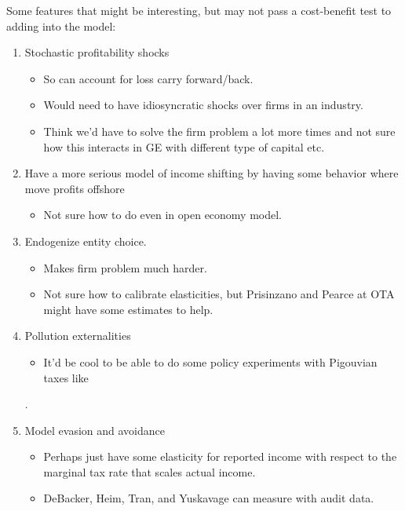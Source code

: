 Some features that might be interesting, but may not pass a cost-benefit test to adding into the model:	
\begin{enumerate}
\item Stochastic profitability shocks	
	\begin{itemize}
	\item So can account for loss carry forward/back.
	\item Would need to have idiosyncratic shocks over firms in an industry.   
	\item Think we'd have to solve the firm problem a lot more times and not sure how this interacts in GE with different type of capital etc.
	\end{itemize}
\item Have a more serious model of income shifting by having some behavior where move profits offshore	
	\begin{itemize}
	\item Not sure how to do even in open economy model.	
	\end{itemize}
\item Endogenize entity choice.		
	\begin{itemize}
	\item Makes firm problem much harder.  
	\item Not sure how to calibrate elasticities, but Prisinzano and Pearce at OTA might have some estimates to help.
	\end{itemize}
\item Pollution externalities	
	\begin{itemize}
	\item It'd be cool to be able to do some policy experiments with Pigouvian taxes like \citet{BM1983}
	\end{itemize}.	
\item Model evasion and avoidance	
	\begin{itemize}
	\item Perhaps just have some elasticity for reported income with respect to the marginal tax rate that scales actual income.	
	\item DeBacker, Heim, Tran, and Yuskavage can measure with audit data.
	\end{itemize}
\end{enumerate}

